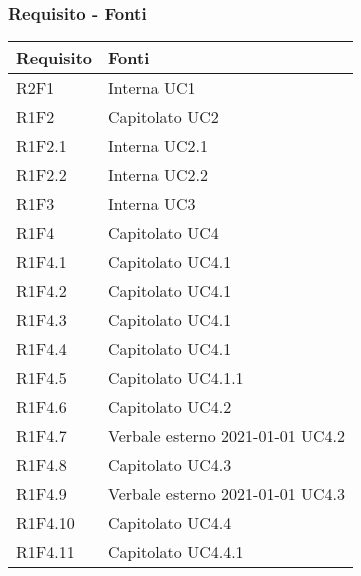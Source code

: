 \subsubsection{Requisito - Fonti}
\begin{center}
	\begin{longtable}{|p{22mm}|p{22mm}|}
		\hline
		\rowcolor{lighter-grayer}
		\textbf{Requisito} &  \textbf{Fonti}  \\
		\hline
		\endhead
		
		R2F1 & 
			Interna \newline
			UC1
		\\
	\hline
		R1F2 & 
		Capitolato \newline
		UC2
	\\
	\hline
		R1F2.1 & 
		Interna \newline
		UC2.1
	\\
	\hline
		R1F2.2 & 
		Interna \newline
		UC2.2
	\\
	\hline
		R1F3 & 
		Interna \newline
		UC3
	\\
	\hline
R1F4	& 
	Capitolato \newline	
	UC4
	\\
	\hline
R1F4.1	& 
	Capitolato \newline
	UC4.1	
	\\

	\hline
R1F4.2	& 
	Capitolato \newline
	UC4.1	
	\\
	\hline
R1F4.3	& 
	Capitolato \newline
	UC4.1	
	\\

	\hline
R1F4.4	& 
	Capitolato \newline
	UC4.1	
	\\
	\hline
R1F4.5	& 
	Capitolato \newline
	UC4.1.1	
	\\
	\hline
R1F4.6	& 
	Capitolato \newline
	UC4.2	
	\\
	\hline
R1F4.7	& 
	Verbale esterno 2021-01-01 \newline
	UC4.2	
	\\
	\hline
R1F4.8	& 
	Capitolato \newline
	UC4.3	
	\\
	\hline
R1F4.9	& 
	Verbale esterno 2021-01-01 \newline
	UC4.3	
	\\
	\hline
R1F4.10	& 
	Capitolato \newline	
	UC4.4
	\\
	\hline
R1F4.11	& 
	Capitolato \newline
	UC4.4.1	
	\\


\end{longtable}
\end{center}
